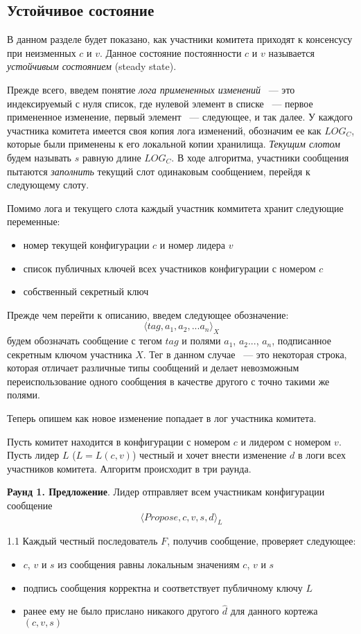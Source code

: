 \subsection{Устойчивое состояние}
В данном разделе будет показано, как участники комитета приходят к консенсусу при неизменных $c$ и $v$. Данное состояние постоянности $c$ и $v$ называется \textit{устойчивым состоянием} (steady state).

Прежде всего, введем понятие \textit{лога примененных изменений} ~--- это индексируемый с нуля список, где нулевой элемент в списке ~--- первое примененное изменение, первый элемент ~--- следующее, и так далее. У каждого участника комитета имеется своя копия лога изменений, обозначим ее как $LOG_C$, которые были применены к его локальной копии хранилища. \textit{Текущим слотом} будем называть $s$ равную длине $LOG_C$. 
В ходе алгоритма, участники сообщения пытаются \textit{заполнить} текущий слот одинаковым сообщением, перейдя к следующему слоту.

Помимо лога и текущего слота каждый участник коммитета хранит следующие переменные:
\begin{itemize}
\item номер текущей конфигурации $c$ и номер лидера $v$
\item список публичных ключей всех участников конфигурации с номером $c$ 
\item собственный секретный ключ
\end{itemize}

Прежде чем перейти к описанию, введем следующее обозначение:
\[ \langle tag, a_1, a_2, ... a_n \rangle_X \] будем обозначать сообщение с тегом $tag$ и полями $a_1$, $a_2$..., $a_n$, подписанное секретным ключом участника $X$. Тег в данном случае ~--- это некоторая строка, которая отличает различные типы сообщений и делает невозможным переиспользование одного сообщения в качестве другого с точно такими же полями.

Теперь опишем как новое изменение попадает в лог участника комитета.

Пусть комитет находится в конфигурации с номером $c$ и лидером с номером $v$. 
Пусть лидер $L$ ($L = L(c, v)$) честный и хочет внести изменение $d$ в логи всех участников комитета. Алгоритм происходит в три раунда.

\textbf{Раунд 1. Предложение}. Лидер отправляет всем участникам конфигурации сообщение 
\[ \langle Propose, c, v, s, d \rangle_L \]

1.1 Каждый честный последователь $F$, получив сообщение, проверяет следующее:
\begin{itemize}
\item $c$, $v$ и $s$ из сообщения равны локальным значениям $c$, $v$ и $s$
\item подпись сообщения корректна и соответствует публичному ключу $L$
\item ранее ему не было прислано никакого другого $\hat d$ для данного кортежа $(c, v, s)$
\end{itemize}

